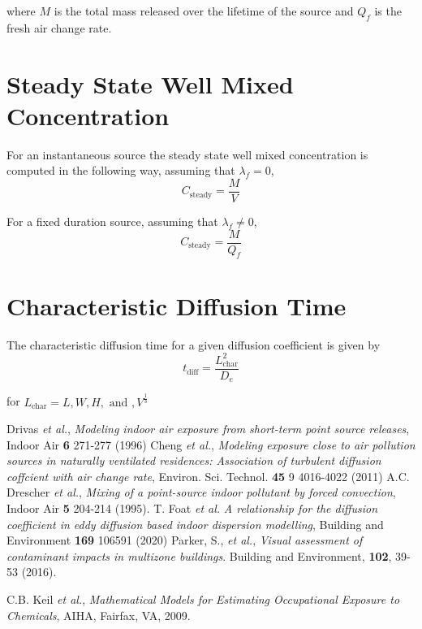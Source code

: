 \documentclass[]{article}
\begin{document}
\noindent where $M$ is the total mass released over the lifetime of the source
and $Q_f$ is the fresh air change rate.

\section{Steady State Well Mixed Concentration}\label{app:steadystate}
For an instantaneous source the steady state well mixed concentration is
computed in the following way, assuming that $\lambda_{f} = 0$,
\begin{equation}
    C_{\text{steady}} = \frac{M}{V}
\end{equation}

\noindent For a fixed duration source, assuming that $\lambda_{f}\neq 0$, 
\begin{equation}
    C_{\text{steady}} = \frac{M}{Q_{f}}
\end{equation}

\section{Characteristic Diffusion Time}\label{app:chardifftime}
The characteristic diffusion time for a given diffusion coefficient is given by 
\begin{equation}
    t_{\text{diff}} = \frac{L_{\text{char}}^{2}}{D_{e}}
\end{equation}

\noindent for $L_{\text{char}} = L, W, H, \text{ and }, V^{\frac{1}{3}}$\

\begin{thebibliography}{10}
     Drivas \emph{et al.}, \emph{Modeling indoor air exposure from
    short-term point source releases}, Indoor Air \textbf{6}
271-277 (1996)
 Cheng \emph{et al.}, \emph{Modeling exposure close to air pollution
sources in naturally ventilated residences: Association of turbulent diffusion
coffcient with air change rate}, Environ. Sci. Technol. \textbf{45} 9
4016-4022 (2011)
     A.C. Drescher \emph{et al.}, \emph{Mixing of a point-source
    indoor pollutant by forced convection}, Indoor Air \textbf{5}
    204-214 (1995).
     T. Foat \emph{et al.} \emph{A relationship for the diffusion coefficient
    in eddy diffusion based indoor dispersion modelling}, Building and
    Environment \textbf{169} 106591 (2020) 
     Parker, S., \emph{et al.}, \emph{Visual assessment
    of contaminant impacts in multizone buildings}. Building and Environment,
    \textbf{102}, 39-53 (2016).  
    
     C.B. Keil \emph{et al.}, \emph{Mathematical Models for Estimating
Occupational Exposure to Chemicals}, AIHA, Fairfax, VA, 2009.
\end{thebibliography}
\end{document}

